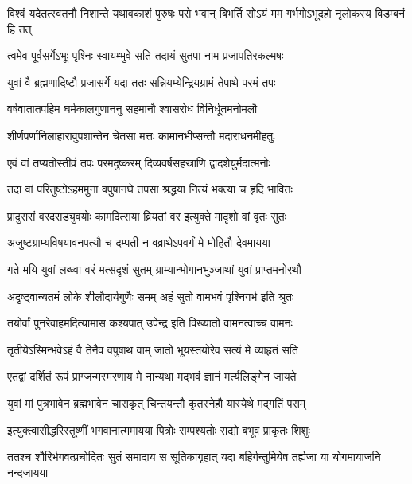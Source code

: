 \twolineshloka
{विश्वं यदेतत्स्वतनौ निशान्ते यथावकाशं पुरुषः परो भवान्}
{बिभर्ति सोऽयं मम गर्भगोऽभूदहो नृलोकस्य विडम्बनं हि तत्} %



\twolineshloka
{त्वमेव पूर्वसर्गेऽभूः पृश्निः स्वायम्भुवे सति}
{तदायं सुतपा नाम प्रजापतिरकल्मषः} %

\twolineshloka
{युवां वै ब्रह्मणादिष्टौ प्रजासर्गे यदा ततः}
{सन्नियम्येन्द्रियग्रामं तेपाथे परमं तपः} %

\twolineshloka
{वर्षवातातपहिम घर्मकालगुणाननु}
{सहमानौ श्वासरोध विनिर्धूतमनोमलौ} %

\twolineshloka
{शीर्णपर्णानिलाहारावुपशान्तेन चेतसा}
{मत्तः कामानभीप्सन्तौ मदाराधनमीहतुः} %

\twolineshloka
{एवं वां तप्यतोस्तीव्रं तपः परमदुष्करम्}
{दिव्यवर्षसहस्राणि द्वादशेयुर्मदात्मनोः} %

\twolineshloka
{तदा वां परितुष्टोऽहममुना वपुषानघे}
{तपसा श्रद्धया नित्यं भक्त्या च हृदि भावितः} %

\twolineshloka
{प्रादुरासं वरदराड्युवयोः कामदित्सया}
{व्रियतां वर इत्युक्ते मादृशो वां वृतः सुतः} %

\twolineshloka
{अजुष्टग्राम्यविषयावनपत्यौ च दम्पती}
{न वव्राथेऽपवर्गं मे मोहितौ देवमायया} %

\twolineshloka
{गते मयि युवां लब्ध्वा वरं मत्सदृशं सुतम्}
{ग्राम्यान्भोगानभुञ्जाथां युवां प्राप्तमनोरथौ} %

\twolineshloka
{अदृष्ट्वान्यतमं लोके शीलौदार्यगुणैः समम्}
{अहं सुतो वामभवं पृश्निगर्भ इति श्रुतः} %

\twolineshloka
{तयोर्वां पुनरेवाहमदित्यामास कश्यपात्}
{उपेन्द्र इति विख्यातो वामनत्वाच्च वामनः} %

\twolineshloka
{तृतीयेऽस्मिन्भवेऽहं वै तेनैव वपुषाथ वाम्}
{जातो भूयस्तयोरेव सत्यं मे व्याहृतं सति} %

\twolineshloka
{एतद्वां दर्शितं रूपं प्राग्जन्मस्मरणाय मे}
{नान्यथा मद्भवं ज्ञानं मर्त्यलिङ्गेन जायते} %

\twolineshloka
{युवां मां पुत्रभावेन ब्रह्मभावेन चासकृत्}
{चिन्तयन्तौ कृतस्नेहौ यास्येथे मद्गतिं पराम्} %



\twolineshloka
{इत्युक्त्वासीद्धरिस्तूष्णीं भगवानात्ममायया}
{पित्रोः सम्पश्यतोः सद्यो बभूव प्राकृतः शिशुः} %

\fourlineindentedshloka
{ततश्च शौरिर्भगवत्प्रचोदितः}
{सुतं समादाय स सूतिकागृहात्}
{यदा बहिर्गन्तुमियेष तर्ह्यजा}
{या योगमायाजनि नन्दजायया} %

